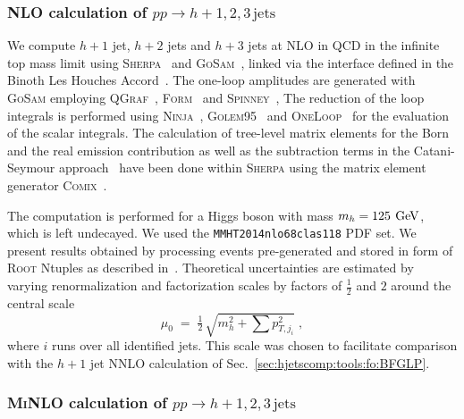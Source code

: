 \subsubsection{NLO calculation of $pp\to h+1,2,3\,\text{jets}$}
\label{sec:hjetscomp:tools:fo:hnj}

We compute $h+1$ jet, $h+2$ jets and
$h+3$ jets at NLO in QCD in the infinite top mass limit 
\cite{vanDeurzen:2013rv,Cullen:2013saa,Greiner:2015jha}
using \textsc{Sherpa}~\cite{Gleisberg:2008ta} and
\textsc{GoSam}~\cite{Cullen:2011ac,Cullen:2014yla}, linked via the
interface defined in the Binoth Les Houches
Accord~\cite{Binoth:2010xt,Alioli:2013nda}.
The one-loop amplitudes are generated with \textsc{GoSam} employing
\textsc{QGraf}~\cite{Nogueira:1991ex},
\textsc{Form}~\cite{Vermaseren:2000nd,Kuipers:2012rf} and
\textsc{Spinney}~\cite{Cullen:2010jv}, The reduction of the loop
integrals is performed using
\textsc{Ninja}~\cite{Mastrolia:2012bu,vanDeurzen:2013saa,Peraro:2014cba},
\textsc{Golem95}~\cite{Heinrich:2010ax,Binoth:2008uq,Cullen:2011kv}
and \textsc{OneLoop}~\cite{vanHameren:2010cp} for the evaluation of
the scalar integrals.
The calculation of tree-level matrix elements for the Born and the
real emission contribution as well as the subtraction terms in the
Catani-Seymour approach~\cite{Catani:1996vz} have been done within
\textsc{Sherpa} using the matrix element generator
\textsc{Comix}~\cite{Gleisberg:2008fv}.

The computation is performed for a Higgs boson with mass
$m_h=125\,\text{\:GeV}$, which is left undecayed. We used the 
\texttt{MMHT2014nlo68clas118} PDF set. We present results 
obtained by processing events pre-generated and
stored in form of \textsc{Root} Ntuples as described
in~\cite{Bern:2013zja}. Theoretical
uncertainties are estimated by varying renormalization and
factorization scales by factors of $\tfrac{1}{2}$ and $2$ 
around the central scale
\begin{equation}
  \mu_0 \;=\; \tfrac{1}{2}\,\sqrt{m_{h}^2+\sum p_{T,j_i}^2}\;,
\end{equation}
where $i$ runs over all identified jets.
This scale was chosen to facilitate comparison with the $h+1$ jet NNLO
calculation of Sec.\ \ref{sec:hjetscomp:tools:fo:BFGLP}.


\subsubsection{\textsc{MiNLO} calculation of $pp\to h+1,2,3\,\text{jets}$}
\label{sec:hjetscomp:tools:fo:hnjminlo}

